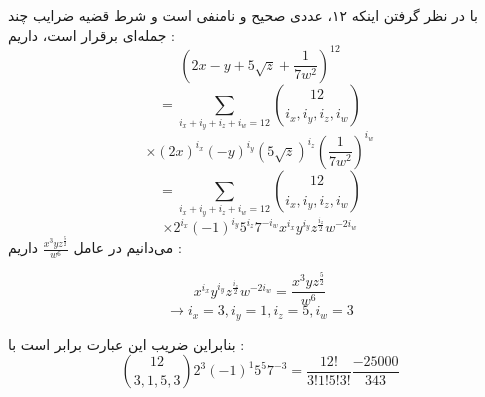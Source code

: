 \p
با در نظر گرفتن اینکه ۱۲، عددی صحیح و نا‌منفی است و شرط قضیه ضرایب چند جمله‌ای برقرار است، داریم :
  $$(2x - y + 5\sqrt{z} + \frac{1}{7w^2})^{12}$$
  $$= \sum\limits_{i_x+i_y+i_z+i_w=12} \binom{12}{i_x,i_y,i_z,i_w}$$
  $$\times (2x)^{i_x} (-y)^{i_y} (5\sqrt{z})^{i_z} (\frac{1}{7w^2})^{i_w}$$
  $$= \sum\limits_{i_x+i_y+i_z+i_w=12} \binom{12}{i_x,i_y,i_z,i_w}$$
  $$\times 2^{i_x} (-1)^{i_y} 5^{i_z} 7^{-i_w} x^{i_x} y^{i_y} z^{\frac{i_z}{2}} w^{-2i_w}$$
می‌دانیم در عامل 
$\frac{x^3 y z^{\frac{5}{2}}}{w^6}$
داریم :

$$x^{i_x} y^{i_y} z^{\frac{i_z}{2}} w^{-2i_w} = \frac{x^3 y z^{\frac{5}{2}}}{w^6}$$
$$\rightarrow i_x = 3 , i_y = 1 , i_z = 5 , i_w = 3$$

بنابراین ضریب این عبارت برابر است با :
$$\binom{12}{3,1,5,3} 2^3 (-1)^1 5^5 7^{-3} = \frac{12!}{3!1!5!3!} \frac{-25000}{343}$$
